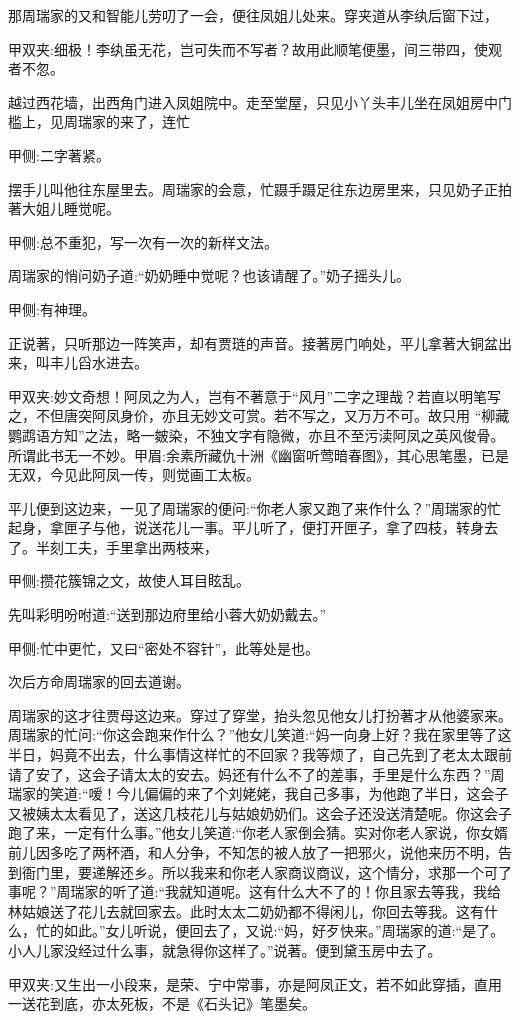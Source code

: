 \begin{parag}
    那周瑞家的又和智能儿劳叨了一会，便往凤姐儿处来。穿夹道从李纨后窗下过，\begin{note}甲双夹:细极！李纨虽无花，岂可失而不写者？故用此顺笔便墨，间三带四，使观者不忽。\end{note}越过西花墙，出西角门进入凤姐院中。走至堂屋，只见小丫头丰儿坐在凤姐房中门槛上，见周瑞家的来了，连忙\begin{note}甲侧:二字著紧。\end{note}摆手儿叫他往东屋里去。周瑞家的会意，忙蹑手蹑足往东边房里来，只见奶子正拍著大姐儿睡觉呢。\begin{note}甲侧:总不重犯，写一次有一次的新样文法。\end{note}周瑞家的悄问奶子道:“奶奶睡中觉呢？也该请醒了。”奶子摇头儿。\begin{note}甲侧:有神理。\end{note}正说著，只听那边一阵笑声，却有贾琏的声音。接著房门响处，平儿拿著大铜盆出来，叫丰儿舀水进去。\begin{note}甲双夹:妙文奇想！阿凤之为人，岂有不著意于“风月”二字之理哉？若直以明笔写之，不但唐突阿凤身价，亦且无妙文可赏。若不写之，又万万不可。故只用 “柳藏鹦鹉语方知”之法，略一皴染，不独文字有隐微，亦且不至污渎阿凤之英风俊骨。所谓此书无一不妙。甲眉:余素所藏仇十洲《幽窗听莺暗春图》，其心思笔墨，已是无双，今见此阿凤一传，则觉画工太板。\end{note}平儿便到这边来，一见了周瑞家的便问:“你老人家又跑了来作什么？”周瑞家的忙起身，拿匣子与他，说送花儿一事。平儿听了，便打开匣子，拿了四枝，转身去了。半刻工夫，手里拿出两枝来，\begin{note}甲侧:攒花簇锦之文，故使人耳目眩乱。\end{note}先叫彩明吩咐道:“送到那边府里给小蓉大奶奶戴去。”\begin{note}甲侧:忙中更忙，又曰“密处不容针”，此等处是也。\end{note}次后方命周瑞家的回去道谢。
\end{parag}


\begin{parag}
    周瑞家的这才往贾母这边来。穿过了穿堂，抬头忽见他女儿打扮著才从他婆家来。周瑞家的忙问:“你这会跑来作什么？”他女儿笑道:“妈一向身上好？我在家里等了这半日，妈竟不出去，什么事情这样忙的不回家？我等烦了，自己先到了老太太跟前请了安了，这会子请太太的安去。妈还有什么不了的差事，手里是什么东西？”周瑞家的笑道:“嗳！今儿偏偏的来了个刘姥姥，我自己多事，为他跑了半日，这会子又被姨太太看见了，送这几枝花儿与姑娘奶奶们。这会子还没送清楚呢。你这会子跑了来，一定有什么事。”他女儿笑道:“你老人家倒会猜。实对你老人家说，你女婿前儿因多吃了两杯酒，和人分争，不知怎的被人放了一把邪火，说他来历不明，告到衙门里，要递解还乡。所以我来和你老人家商议商议，这个情分，求那一个可了事呢？”周瑞家的听了道:“我就知道呢。这有什么大不了的！你且家去等我，我给林姑娘送了花儿去就回家去。此时太太二奶奶都不得闲儿，你回去等我。这有什么，忙的如此。”女儿听说，便回去了，又说:“妈，好歹快来。”周瑞家的道:“是了。小人儿家没经过什么事，就急得你这样了。”说著。便到黛玉房中去了。\begin{note}甲双夹:又生出一小段来，是荣、宁中常事，亦是阿凤正文，若不如此穿插，直用一送花到底，亦太死板，不是《石头记》笔墨矣。\end{note}
\end{parag}


